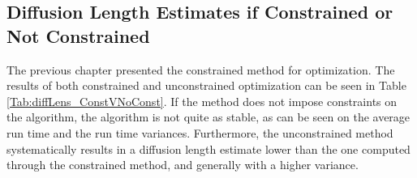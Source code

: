 \documentclass[../../CompleteThesis2/Complete_2ndDraft]{subfiles}
\begin{document}

\subsection[$\sigma$ Constraints or No constraints]{Diffusion Length Estimates if Constrained or Not Constrained}
\label{Subsec:Results_DiffLenEst_AlphabetCores_ConstraintsVNoConstraints}
The previous chapter presented the constrained method for optimization. The results of both constrained and unconstrained optimization can be seen in Table \ref{Tab:diffLens_ConstVNoConst}. If the method does not impose constraints on the algorithm, the algorithm is not quite as stable, as can be seen on the average run time and the run time variances. Furthermore, the unconstrained method systematically results in a diffusion length estimate lower than the one computed through the constrained method, and generally with a higher variance. 
\end{document}
